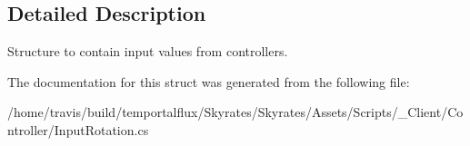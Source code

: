 \subsection{Detailed Description}
Structure to contain input values from controllers. 



The documentation for this struct was generated from the following file\-:\begin{DoxyCompactItemize}
\item 
/home/travis/build/temportalflux/\-Skyrates/\-Skyrates/\-Assets/\-Scripts/\-\_\-\-Client/\-Controller/Input\-Rotation.\-cs\end{DoxyCompactItemize}
